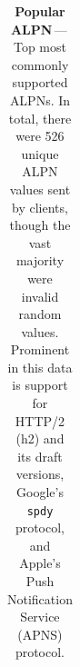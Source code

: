 {\begin{table}
{\begin{tabular}{r c c}
            \toprule
    \end{tabular}
    }
    \caption{\textbf{Popular ALPN}\,---\, Top most commonly supported ALPNs. In total, there
            were 526 unique ALPN values sent by clients, though the vast majority were invalid random values.
            Prominent in this data is support for HTTP/2 (h2) and its draft versions,
            Google's \texttt{spdy} protocol, and Apple's Push Notification Service (APNS) protocol.
    }
    \label{tab:popularALPN}
\end{table}
}

\newcommand{\FigTopNoSNI}{
    \begin{figure}[ht]
        \centering
    \texttt{[image: figures/sniless-cdf.pdf]}
    \caption{\textbf{CDF of connections sending no SNI}\,---\, %
        We observed 1.4\% of connections did not send the server name indication (SNI)
        extension, with the majority coming from just 10 fingerprints. This suggests a censor
        could easily block circumvention tools that do not send SNIs, with either a small
        amount of collateral overblocking or minimal whitelisted exceptions.}
    \label{fig:sniless-cdf}
    \end{figure}
}

